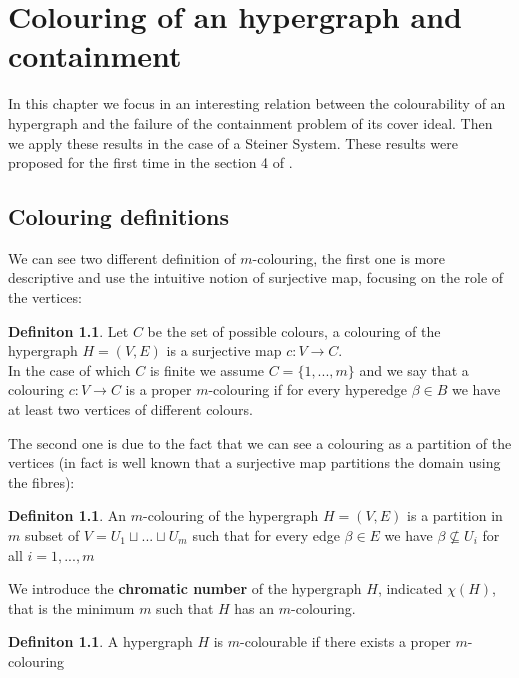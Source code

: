 \documentclass[notitlepage, a4]{book}
\theoremstyle{plain}
\theoremstyle{remark}
\theoremstyle{definition}
\newtheorem{deff}[teo]{Definiton}
\begin{document}
 

\chapter{Colouring of an hypergraph and containment} \label{cha:coul}

In this chapter we focus in an interesting relation between the colourability of an hypergraph and  the failure of the containment problem of its cover ideal. Then we apply these results in the case of a Steiner System. These results were proposed for the first time in the section 4 of \cite{Bal21Steiner}.
 
\section{Colouring definitions}

We can see two different definition of $ m $-colouring, the first one is more descriptive and use the intuitive notion of surjective map, focusing on the role of the vertices: 
\begin{deff}\label{def:colouring1}
Let $ C $ be the set of possible colours, a colouring of the hypergraph $ H = (V,E) $ is a surjective map $ c : V \to C $. \\
In the case of which $ C $ is finite we assume $ C = \{ 1 , ... , m\} $ and we say that a colouring $ c : V \to C $ is a proper $ m $-colouring if for every hyperedge $ \beta \in B $ we have at least two vertices of different colours. 
\end{deff}

The second one is due to the fact that we can see a colouring as a partition of the vertices (in fact is well known that a surjective map partitions the domain using the fibres):

\begin{deff}
An $ m $-colouring of the hypergraph $ H = (V,E) $ is a partition in $ m $ subset of $ V = U_1 \sqcup ... \sqcup U_m $ such that for every edge $ \beta \in E $ we have $ \beta \not \subseteq U_i $ for all $ i = 1, ... , m $
\end{deff}
 
We introduce the \textbf{chromatic number} of the hypergraph $ H $, indicated $ \chi(H) $, that is the minimum $ m $ such that $ H $ has an $ m $-colouring.

\begin{deff}
A hypergraph $ H $ is $ m $-colourable if there exists a proper $ m $-colouring
\end{deff}
\end{document}

